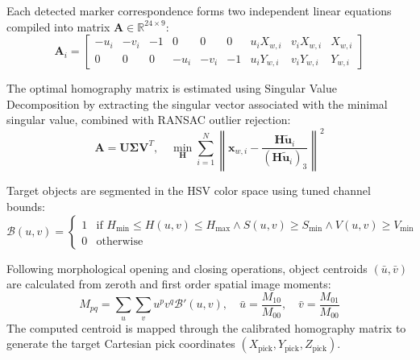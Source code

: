 \documentclass{svproc}
\begin{document}
Each detected marker correspondence forms two independent linear equations compiled into matrix $\mathbf{A} \in \mathbb{R}^{24 \times 9}$:
\begin{equation}
    \mathbf{A}_i = \begin{bmatrix} -u_i & -v_i & -1 & 0 & 0 & 0 & u_i X_{w,i} & v_i X_{w,i} & X_{w,i} \\ 0 & 0 & 0 & -u_i & -v_i & -1 & u_i Y_{w,i} & v_i Y_{w,i} & Y_{w,i} \end{bmatrix}
\end{equation}

The optimal homography matrix is estimated using Singular Value Decomposition by extracting the singular vector associated with the minimal singular value, combined with RANSAC outlier rejection:
\begin{equation}
    \mathbf{A} = \mathbf{U} \mathbf{\Sigma} \mathbf{V}^T, \quad \min_{\mathbf{H}} \sum_{i=1}^N \left\| \mathbf{x}_{w,i} - \frac{\mathbf{H} \tilde{\mathbf{u}}_i}{(\mathbf{H} \tilde{\mathbf{u}}_i)_3} \right\|^2
\end{equation}

Target objects are segmented in the HSV color space using tuned channel bounds:
\begin{equation}
    \mathcal{B}(u,v) = \begin{cases} 1 & \text{if } H_{\text{min}} \le H(u,v) \le H_{\text{max}} \land S(u,v) \ge S_{\text{min}} \land V(u,v) \ge V_{\text{min}} \\ 0 & \text{otherwise} \end{cases}
\end{equation}

Following morphological opening and closing operations, object centroids $(\bar{u}, \bar{v})$ are calculated from zeroth and first order spatial image moments:
\begin{equation}
    M_{pq} = \sum_{u} \sum_{v} u^p v^q \mathcal{B}'(u,v), \quad \bar{u} = \frac{M_{10}}{M_{00}}, \quad \bar{v} = \frac{M_{01}}{M_{00}}
\end{equation}
The computed centroid is mapped through the calibrated homography matrix to generate the target Cartesian pick coordinates $(X_{\text{pick}}, Y_{\text{pick}}, Z_{\text{pick}})$.
\end{document}
